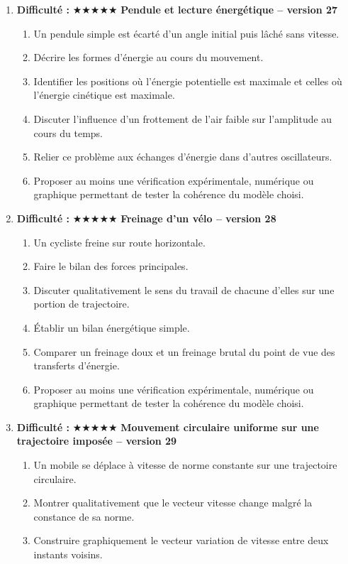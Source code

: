 \documentclass[11pt,a4paper]{article}
\newcommand{\etoiles}[1]{\textbf{Difficulté : }#1}
\begin{document}
\begin{enumerate}[label=\textbf{Problème long \arabic*.},leftmargin=*]
\begin{enumerate}[label=\alph*)]
\end{enumerate}
\item \etoiles{★★★★★}
\textbf{Pendule et lecture énergétique -- version 27}
\begin{enumerate}[label=\alph*)]
\item Un pendule simple est écarté d'un angle initial puis lâché sans vitesse.
\item Décrire les formes d'énergie au cours du mouvement.
\item Identifier les positions où l'énergie potentielle est maximale et celles où l'énergie cinétique est maximale.
\item Discuter l'influence d'un frottement de l'air faible sur l'amplitude au cours du temps.
\item Relier ce problème aux échanges d'énergie dans d'autres oscillateurs.
\item Proposer au moins une vérification expérimentale, numérique ou graphique permettant de tester la cohérence du modèle choisi.
\end{enumerate}
\item \etoiles{★★★★★}
\textbf{Freinage d'un vélo -- version 28}
\begin{enumerate}[label=\alph*)]
\item Un cycliste freine sur route horizontale.
\item Faire le bilan des forces principales.
\item Discuter qualitativement le sens du travail de chacune d'elles sur une portion de trajectoire.
\item Établir un bilan énergétique simple.
\item Comparer un freinage doux et un freinage brutal du point de vue des transferts d'énergie.
\item Proposer au moins une vérification expérimentale, numérique ou graphique permettant de tester la cohérence du modèle choisi.
\end{enumerate}
\item \etoiles{★★★★★}
\textbf{Mouvement circulaire uniforme sur une trajectoire imposée -- version 29}
\begin{enumerate}[label=\alph*)]
\item Un mobile se déplace à vitesse de norme constante sur une trajectoire circulaire.
\item Montrer qualitativement que le vecteur vitesse change malgré la constance de sa norme.
\item Construire graphiquement le vecteur variation de vitesse entre deux instants voisins.

\end{enumerate}
\end{enumerate}
\end{document}
